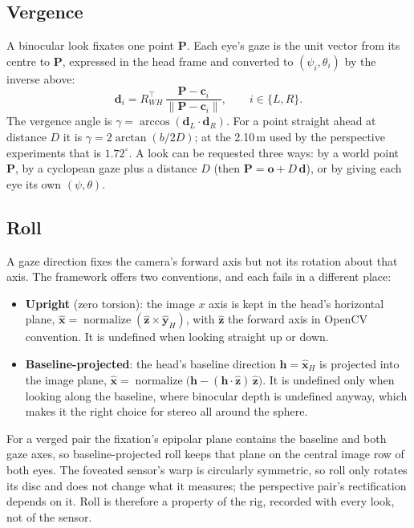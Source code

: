 \documentclass[11pt,a4paper]{article}
\newcommand{\vb}[1]{\mathbf{#1}}
\DeclareMathOperator{\normalize}{normalize}
\begin{document}
\subsection{Vergence}\label{sec:vergence}

A binocular look fixates one point $\vb{P}$. Each eye's gaze is the unit vector from its centre to $\vb{P}$,
expressed in the head frame and converted to $(\psi_i,\theta_i)$ by the inverse above:
\begin{equation}\label{eq:vergence}
\vb{d}_i = R_{WH}^{\top}\,\frac{\vb{P}-\vb{c}_i}{\lVert\vb{P}-\vb{c}_i\rVert}, \qquad i \in \{L, R\}.
\end{equation}
The vergence angle is $\gamma = \arccos(\vb{d}_L\cdot\vb{d}_R)$. For a point straight ahead at distance $D$ it is
$\gamma = 2\arctan(b/2D)$; at the 2.10\,m used by the perspective experiments that is $1.72^\circ$. A look can be
requested three ways: by a world point $\vb{P}$, by a cyclopean gaze plus a distance $D$ (then
$\vb{P} = \vb{o} + D\,\vb{d}$), or by giving each eye its own $(\psi,\theta)$.

\subsection{Roll}\label{sec:roll}

A gaze direction fixes the camera's forward axis but not its rotation about that axis. The framework offers two
conventions, and each fails in a different place:
\begin{itemize}
\item \textbf{Upright} (zero torsion): the image $x$ axis is kept in the head's horizontal plane,
  $\hat{\vb{x}} = \normalize(\hat{\vb{z}} \times \hat{\vb{y}}_H)$, with $\hat{\vb{z}}$ the forward axis in OpenCV
  convention. It is undefined when looking straight up or down.
\item \textbf{Baseline-projected}: the head's baseline direction $\vb{h} = \hat{\vb{x}}_H$ is projected into the
  image plane, $\hat{\vb{x}} = \normalize\bigl(\vb{h} - (\vb{h}\cdot\hat{\vb{z}})\,\hat{\vb{z}}\bigr)$. It is
  undefined only when looking along the baseline, where binocular depth is undefined anyway, which makes it the
  right choice for stereo all around the sphere.
\end{itemize}
For a verged pair the fixation's epipolar plane contains the baseline and both gaze axes, so baseline-projected
roll keeps that plane on the central image row of both eyes. The foveated sensor's warp is circularly symmetric,
so roll only rotates its disc and does not change what it measures; the perspective pair's rectification depends
on it. Roll is therefore a property of the rig, recorded with every look, not of the sensor.
\end{document}
